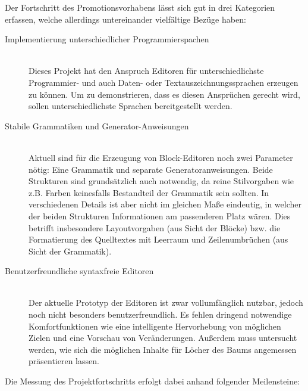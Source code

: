 \documentclass[paper=a4,fontsize=12pt,parskip=half]{scrartcl}
\begin{document}
Der Fortschritt des Promotionsvorhabens lässt sich gut in drei Kategorien erfassen, welche allerdings untereinander vielfältige Bezüge haben:

\begin{description}
\item[Implementierung unterschiedlicher Programmierspachen] \hfill\\
  Dieses Projekt hat den Anspruch Editoren für unterschiedlichste Programmier- und auch Daten- oder Textauszeichnungssprachen erzeugen zu können. Um zu demonstrieren, dass es diesen Ansprüchen gerecht wird, sollen unterschiedlichste Sprachen bereitgestellt werden.

\item[Stabile Grammatiken und Generator-Anweisungen] \hfill\\
  Aktuell sind für die Erzeugung von Block-Editoren noch zwei Parameter nötig: Eine Grammatik und separate Generatoranweisungen. Beide Strukturen sind grundsätzlich auch notwendig, da reine Stilvorgaben wie z.B. Farben keinesfalls Bestandteil der Grammatik sein sollten. In verschiedenen Details ist aber nicht im gleichen Maße eindeutig, in welcher der beiden Strukturen Informationen am passenderen Platz wären. Dies betrifft insbesondere Layoutvorgaben (aus Sicht der Blöcke) bzw. die Formatierung des Quelltextes mit Leerraum und Zeilenumbrüchen (aus Sicht der Grammatik).

\item[Benutzerfreundliche syntaxfreie Editoren] \hfill\\
  Der aktuelle Prototyp der Editoren ist zwar vollumfänglich nutzbar, jedoch noch nicht besonders benutzerfreundlich. Es fehlen dringend notwendige Komfortfunktionen wie eine intelligente Hervorhebung von möglichen Zielen und eine Vorschau von Veränderungen. Außerdem muss untersucht werden, wie sich die möglichen Inhalte für Löcher des Baums angemessen präsentieren lassen.
\end{description}

Die Messung des Projektfortschritts erfolgt dabei anhand folgender Meilensteine:
\end{document}
